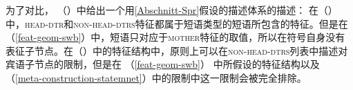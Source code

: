 \noindent
为了对比， （）中给出一个用\ref{Abschnitt-Spr}假设的描述体系的描述：
\ea
{}
\z
在（）中，\textsc{head-dtr}和\textsc{non-head-dtrs}特征都属于短语类型的短语所包含的特征。但是在 （\ref{feat-geom-swb}）中，短语只对应于\textsc{mother}特征的取值，所以在符号自身没有表征子节点。在（）中的特征结构中，原则上可以在\textsc{non-head-dtrs}列表中描述对宾语子节点的限制，但是在 （\ref{feat-geom-swb}） 中所假设的特征结构以及（\ref{meta-construction-statemnet}）中的限制中这一限制会被完全排除。

